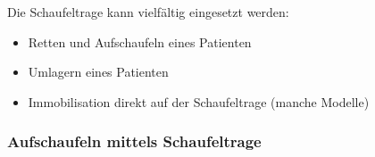 Die Schaufeltrage kann vielfältig eingesetzt werden:

\begin{itemize}
  \item Retten und Aufschaufeln eines Patienten \dotfill
  \item Umlagern eines Patienten \dotfill {}
  \item Immobilisation direkt auf der Schaufeltrage (manche
  Modelle) \dotfill {}
\end{itemize}

\clearpage
\subsubsection{Aufschaufeln mittels Schaufeltrage}
\label{topic:schaufeltrage-aufschaufeln}

